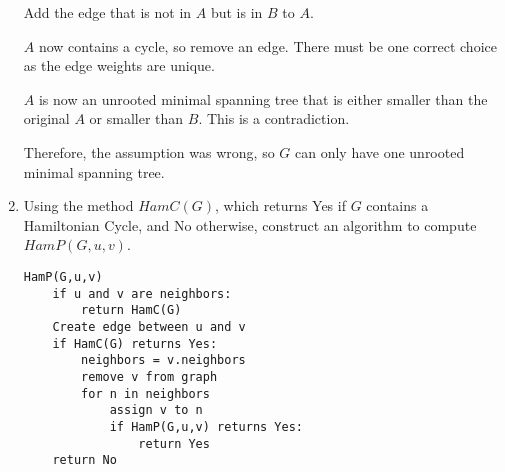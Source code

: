 \documentclass[12pt]{article}
\begin{document}
\begin{enumerate}
Add the edge that is not in $A$ but is in $B$ to $A$.

$A$ now contains a cycle, so remove an edge. There must be one
correct choice as the edge weights are unique.

$A$ is now an unrooted minimal spanning tree that is either
smaller than the original $A$ or smaller than $B$. This is a contradiction.

Therefore, the assumption was wrong, so $G$ can only have one
unrooted minimal spanning tree.


\item Using the method $HamC(G)$, which returns Yes if $G$ contains a
Hamiltonian Cycle, and No otherwise, construct an algorithm to compute
$HamP(G,u,v)$.

\begin{lstlisting}
HamP(G,u,v)
    if u and v are neighbors:
        return HamC(G)
    Create edge between u and v
    if HamC(G) returns Yes:
        neighbors = v.neighbors
        remove v from graph
        for n in neighbors
            assign v to n
            if HamP(G,u,v) returns Yes:
                return Yes
    return No

\end{lstlisting}

\end{enumerate}
\end{document}
